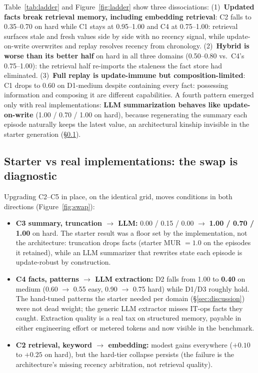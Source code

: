 \documentclass[11pt]{article}
\begin{document}
Table~\ref{tab:ladder} and Figure~\ref{fig:ladder} show three dissociations:
(1)~\textbf{Updated facts break retrieval memory, including embedding
retrieval}: C2 falls to 0.35--0.70 on hard while C1 stays at 0.95--1.00 and
C4 at 0.75--1.00: retrieval surfaces stale and fresh values side by side
with no recency signal, while update-on-write overwrites and replay resolves
recency from chronology. (2)~\textbf{Hybrid is worse than its better half}
on hard in all three domains (0.50--0.80 vs.\ C4's 0.75--1.00): the
retrieval half re-imports the staleness the fact store had eliminated.
(3)~\textbf{Full replay is update-immune but composition-limited}: C1 drops
to 0.60 on D1-medium despite containing every fact: possessing information
and composing it are different capabilities. A fourth pattern emerged only
with real implementations: \textbf{LLM summarization behaves like
update-on-write} (1.00 / 0.70 / 1.00 on hard), because regenerating the
summary each episode naturally keeps the latest value, an architectural
kinship invisible in the starter generation (\S\ref{sec:swap}).

\subsection{Starter vs real implementations: the swap is diagnostic}
\label{sec:swap}

Upgrading C2--C5 in place, on the identical grid, moves conditions in both
directions (Figure~\ref{fig:swap}):

\begin{itemize}
\item \textbf{C3 summary, truncation $\to$ LLM:} 0.00 / 0.15 / 0.00 $\to$
\textbf{1.00 / 0.70 / 1.00} on hard. The starter result was a floor set by
the implementation, not the architecture: truncation drops facts (starter
MUR $= 1.0$ on the episodes it retained), while an LLM summarizer that
rewrites state each episode is update-robust by construction.
\item \textbf{C4 facts, patterns $\to$ LLM extraction:} D2 falls from 1.00
to \textbf{0.40} on medium (0.60 $\to$ 0.55 easy, 0.90 $\to$ 0.75 hard)
while D1/D3 roughly hold. The hand-tuned patterns the starter needed per
domain (\S\ref{sec:discussion}) were not dead weight; the generic LLM
extractor misses IT-ops facts they caught. Extraction quality is a real tax
on structured memory, payable in either engineering effort or metered tokens
and now visible in the benchmark.
\item \textbf{C2 retrieval, keyword $\to$ embedding:} modest gains
everywhere ($+0.10$ to $+0.25$ on hard), but the hard-tier collapse persists
(the failure is the architecture's missing recency arbitration, not
retrieval quality).
\end{itemize}
\end{document}
